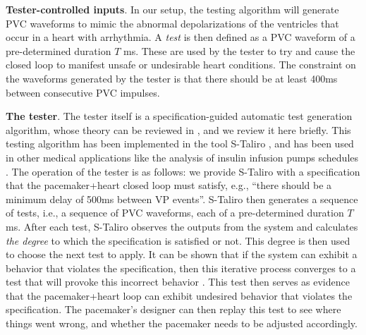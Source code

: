 \textbf{Tester-controlled inputs}.
In our setup, the testing algorithm will generate PVC waveforms to mimic the abnormal depolarizations of the ventricles that occur in a heart with arrhythmia. 
A \emph{test} is then defined as a PVC waveform of a pre-determined duration $T$ ms.
These are used by the tester to try and cause the closed loop to manifest unsafe or undesirable heart conditions.
The constraint on the waveforms generated by the tester is that there should be at least 400ms between consecutive PVC impulses.

\textbf{The tester}.
The tester itself is a specification-guided automatic test generation algorithm, whose theory can be reviewed in \cite{AbbasFSIG13tecs}, and we review it here briefly.
This testing algorithm has been implemented in the tool S-Taliro \cite{AnnapureddyLFS11tacas}, and has been used in other medical applications like the analysis of insulin infusion pumps schedules \cite{SankaranarayananF2012cmsb}.
The operation of the tester is as follows: we provide S-Taliro with a specification that the pacemaker+heart closed loop must satisfy,
e.g., ``there should be a minimum delay of 500ms between VP events''.
S-Taliro then generates a sequence of tests, i.e., a sequence of PVC waveforms, each of a pre-determined duration $T$ ms.
After each test, S-Taliro observes the outputs from the system and calculates \emph{the degree} to which the specification is satisfied or not.
This degree is then used to choose the next test to apply. 
It can be shown that if the system can exhibit a behavior that violates the specification, then this iterative process converges to a test that will provoke this incorrect behavior \cite{AbbasF_HybridSA12}. 
This test then serves as evidence that the pacemaker+heart loop can exhibit undesired behavior that violates the specification.
The pacemaker's designer can then replay this test to see where things went wrong, and whether the pacemaker needs to be adjusted accordingly.

